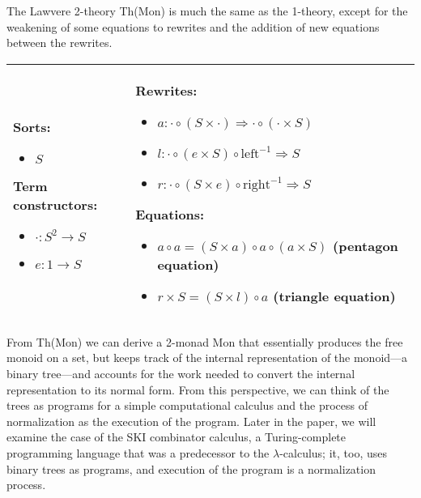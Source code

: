 \documentclass{llncs}
\newcommand{\maps}{\colon}
\newcommand{\leftu}{\mathrm{left}}
\newcommand{\rightu}{\mathrm{right}}
\begin{document}
The Lawvere 2-theory Th(Mon) is much the same as the 1-theory, except for the weakening of some equations to rewrites and the addition of new equations between the rewrites.

\begin{center}
  \begin{longtable}{|p{0.3\linewidth}|p{0.7\linewidth}|}
    \hline
    Sorts:
    \begin{itemize}
      \item $S$
    \end{itemize}
    Term constructors:
    \begin{itemize}
      \item $\cdot\maps S^2 \to S$
      \item $e\maps 1 \to S$
    \end{itemize}
    &
    Rewrites:
    \begin{itemize}
      \item $a\maps \cdot \circ (S \times \cdot) \Rightarrow \cdot \circ (\cdot \times S)$
      \item $l\maps \cdot \circ (e \times S) \circ \leftu^{-1} \Rightarrow S$
      \item $r\maps \cdot \circ (S \times e) \circ \rightu^{-1} \Rightarrow S$
    \end{itemize}
    Equations:
    \begin{itemize}
      \item $a \circ a = (S \times a) \circ a \circ (a \times S)$ (pentagon equation)
      \item $r \times S = (S \times l) \circ a$ (triangle equation)
    \end{itemize}\\
    \hline
  \end{longtable}
\end{center}
From Th(Mon) we can derive a 2-monad Mon that essentially produces the free monoid on a set, but keeps track of the internal representation of the monoid---a binary tree---and accounts for the work needed to convert the internal representation to its normal form.  From this perspective, we can think of the trees as programs for a simple computational calculus and the process of normalization as the execution of the program.  Later in the paper, we will examine the case of the SKI combinator calculus, a Turing-complete programming language that was a predecessor to the $\lambda$-calculus; it, too, uses binary trees as programs, and execution of the program is a normalization process.
\end{document}
